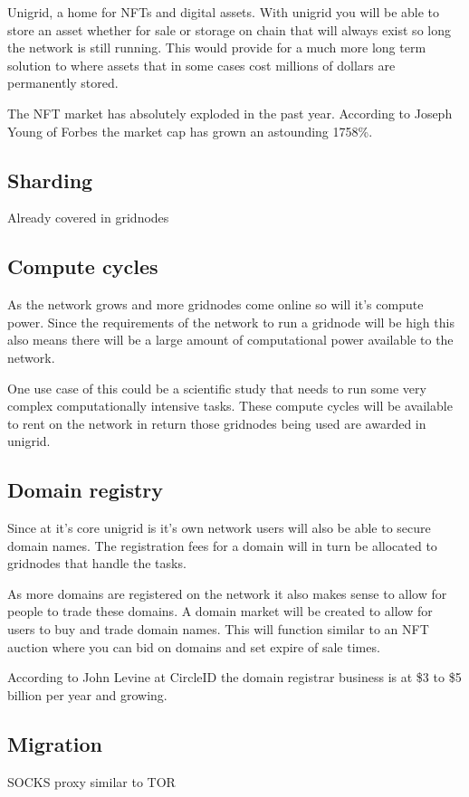 \documentclass[12pt]{article}
\begin{document}
Unigrid, a home for NFTs and digital assets. With unigrid you will be able to store an asset whether for sale or storage on chain that will always exist so long the network is still running. This would provide for a much more long term solution to where assets that in some cases cost millions of dollars are permanently stored.

The NFT market has absolutely exploded in the past year. According to Joseph Young of Forbes the market cap has grown an astounding 1758\%\cite{young2021}.

\subsection*{Sharding}
Already covered in gridnodes

\subsection*{Compute cycles}
As the network grows and more gridnodes come online so will it's compute power. Since the requirements of the network to run a gridnode will be high this also means there will be a large amount of computational power available to the network.

One use case of this could be a scientific study that needs to run some very complex computationally intensive tasks. These compute cycles will be available to rent on the network in return those gridnodes being used are awarded in unigrid.

\subsection*{Domain registry}
Since at it's core unigrid is it's own network users will also be able to secure domain names. The registration fees for a domain will in turn be allocated to gridnodes that handle the tasks.

As more domains are registered on the network it also makes sense to allow for people to trade these domains. A domain market will be created to allow for users to buy and trade domain names. This will function similar to an NFT auction where you can bid on domains and set expire of sale times.

According to John Levine at CircleID \cite{john2018} the domain registrar business is at \$3 to \$5 billion per year and growing. 


\subsection*{Migration }
SOCKS proxy similar to TOR
\end{document}
